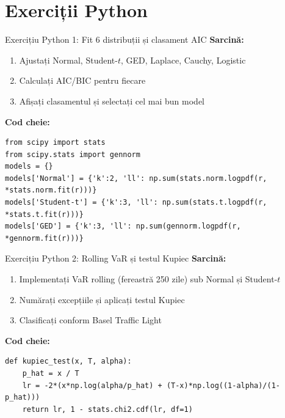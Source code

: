 \documentclass[9pt, aspectratio=169, t]{beamer}
\begin{document}
\section{Exerciții Python}

\begin{frame}[fragile]{Exercițiu Python 1: Fit 6 distribuții și clasament AIC}
    \textbf{Sarcină:}
    \begin{enumerate}\setlength{\itemsep}{0pt}
        \item Ajustați Normal, Student-$t$, GED, Laplace, Cauchy, Logistic
        \item Calculați AIC/BIC pentru fiecare
        \item Afișați clasamentul și selectați cel mai bun model
    \end{enumerate}

    \vspace{0.3cm}
    \textbf{Cod cheie:}
    \begin{verbatim}
from scipy import stats
from scipy.stats import gennorm
models = {}
models['Normal'] = {'k':2, 'll': np.sum(stats.norm.logpdf(r, *stats.norm.fit(r)))}
models['Student-t'] = {'k':3, 'll': np.sum(stats.t.logpdf(r, *stats.t.fit(r)))}
models['GED'] = {'k':3, 'll': np.sum(gennorm.logpdf(r, *gennorm.fit(r)))}
    \end{verbatim}

\end{frame}

\begin{frame}[fragile]{Exercițiu Python 2: Rolling VaR și testul Kupiec}
    \textbf{Sarcină:}
    \begin{enumerate}\setlength{\itemsep}{0pt}
        \item Implementați VaR rolling (fereastră 250 zile) sub Normal și Student-$t$
        \item Numărați excepțiile și aplicați testul Kupiec
        \item Clasificați conform Basel Traffic Light
    \end{enumerate}

    \vspace{0.3cm}
    \textbf{Cod cheie:}
    \begin{verbatim}
def kupiec_test(x, T, alpha):
    p_hat = x / T
    lr = -2*(x*np.log(alpha/p_hat) + (T-x)*np.log((1-alpha)/(1-p_hat)))
    return lr, 1 - stats.chi2.cdf(lr, df=1)
    \end{verbatim}

\end{frame}
\end{document}
